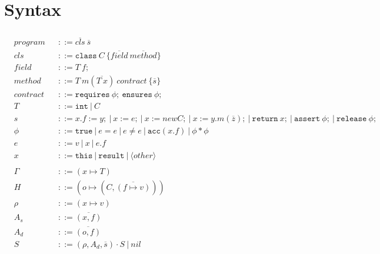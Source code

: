 \documentclass[11pt,a4paper]{article}
\begin{document}

\newcommand{\sfrme}{\ensuremath{\vdash_\texttt{sfrm}}}
\newcommand{\sfrmphi}{\ensuremath{\vdash_\texttt{sfrm}}}
\newcommand{\true}{\ensuremath{\texttt{true}}}
\newcommand{\vnull}{\ensuremath{\texttt{null}}}
\newcommand{\Tint}{\ensuremath{\texttt{int}}}
\newcommand{\xresult}{\ensuremath{\texttt{result}}}
\newcommand{\xthis}{\ensuremath{\texttt{this}}}
\newcommand{\new}{\ensuremath{\texttt{new}~}}
\newcommand{\assert}{\ensuremath{\texttt{assert}~}}
\newcommand{\release}{\ensuremath{\texttt{release}~}}
\newcommand{\return}{\ensuremath{\texttt{return}~}}
\newcommand{\acc}{\ensuremath{\texttt{acc}}}
\newcommand{\fields}{\ensuremath{\texttt{fields}}}
\newcommand{\mpre}{\ensuremath{\texttt{mpre}}}
\newcommand{\mpost}{\ensuremath{\texttt{mpost}}}
\newcommand{\staticFP}{\ensuremath{\texttt{static-footprint}}}
\newcommand{\dynamicFP}{\ensuremath{\texttt{footprint}_{H, \rho}}}
\newcommand{\rlabel}[1]{\RightLabel{\quad #1}}

\newcommand{\class}{\ensuremath{\texttt{class}~}}
\newcommand{\requires}{\ensuremath{\texttt{requires}~}}
\newcommand{\ensures}{\ensuremath{\texttt{ensures}~}}

\section{Syntax}

\begin{align*}
\\ &program    	&&::= \overline{cls}~\overline{s}
\\ &cls    		&&::= \class C~\{\overline{field}~\overline{method}\}
\\ &field    	&&::= T~f;
\\ &method		&&::= T~m(\overline{T~x})~contract~\{\overline{s}\}
\\ &contract	&&::= \requires \phi;~\ensures \phi;
\\ &T			&&::= \Tint ~|~ C
\\ &s			&&::= x.f := y;
				  ~|~ x := e; 
				  ~|~ x := new C; 
				  ~|~ x := y.m(\overline{z});
				  ~|~ \return x; 
				  ~|~ \assert \phi; 
				  ~|~ \release \phi;
\\ &\phi		&&::= \true
				  ~|~ e = e
				  ~|~ e \neq e
				  ~|~ \acc(x.f)
				  ~|~ \phi * \phi
\\ &e			&&::= v
				  ~|~ x
				  ~|~ e.f
\\ &x			&&::= \xthis ~|~ \xresult ~|~ \langle other \rangle
\\				  
\\ &\Gamma		&&::= (x \mapsto T)
\\ &H			&&::= (o \mapsto (C,\overline{(f \mapsto v)}))
\\ &\rho		&&::= (x \mapsto v)
\\ &A_s			&&::= \overline{(x, f)}
\\ &A_d			&&::= \overline{(o, f)}
\\ &S			&&::= (\rho, A_d, \overline{s}) \cdot S ~|~ nil
\end{align*}
\end{document}
